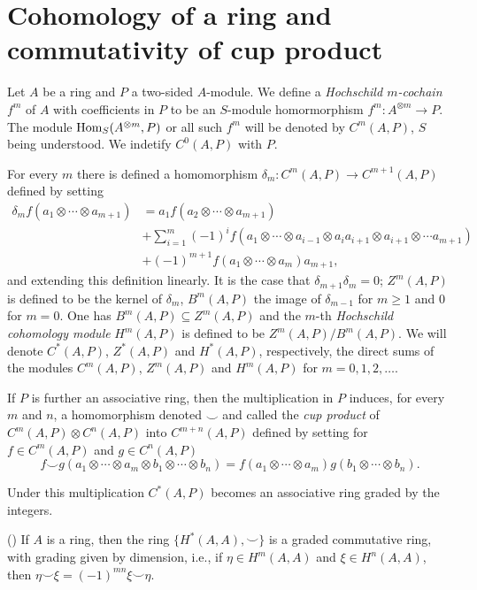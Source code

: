 \documentclass[TFM.tex]{subfiles}
\begin{document}
\section{Cohomology of a ring and commutativity of cup product}

\begin{defi}Let $A$ be a ring and $P$ a two-sided $A$-module. We define a \emph{Hochschild $m$-cochain} $f^m$ of $A$ with coefficients in $P$ to be an $S$-module homormorphism $f^m: A^{\otimes m}\to P$. The module $\operatorname{Hom}_S(A^{\otimes m}, P)$ or all such $f^m$ will be denoted by $C^m(A,P)$, $S$ being understood. We indetify $C^0(A,P)$ with $P$.
\end{defi}

For every $m$ there is defined a homomorphism $\delta_m: C^m(A,P)\to C^{m+1}(A,P)$ defined by setting
\begin{align*}
\delta_m f(a_1\otimes\cdots\otimes a_{m+1})&=a_1f(a_2\otimes\cdots\otimes a_{m+1})\\
& +\sum_{i=1}^m(-1)^if(a_1\otimes\cdots\otimes a_{i-1}\otimes a_ia_{i+1}\otimes a_{i+1}\otimes\cdots a_{m+1})\\
& +(-1)^{m+1}f(a_1\otimes\cdots\otimes a_m)a_{m+1},
\end{align*}
and extending this definition linearly. It is the case that $\delta_{m+1}\delta_m=0$; $Z^m(A,P)$ is defined to be the kernel of $\delta_m$, $B^m(A,P)$ the image of $\delta_{m-1}$ for $m\geq 1$ and 0 for $m=0$. One has $B^m(A,P)\subseteq Z^m(A,P)$ and the $m$-th \emph{Hochschild cohomology module} $H^m(A,P)$ is defined to be $Z^m(A,P)/B^m(A,P)$. We will denote $C^*(A,P)$, $Z^*(A,P)$ and $H^*(A,P)$, respectively, the direct sums of the modules $C^m(A,P)$, $Z^m(A,P)$ and $H^m(A,P)$ for $m=0,1,2,\dots$. 

If $P$ is further an associative ring, then the multiplication in $P$ induces, for every $m$ and $n$, a homomorphism denoted $\smile$ and called the \emph{cup product} of $C^m(A,P)\otimes C^n(A,P)$ into $C^{m+n}(A,P)$ defined by setting for $f\in C^m(A,P)$ and $g\in C^n(A,P)$
\[
f\smile g(a_1\otimes\cdots\otimes a_m\otimes b_1\otimes\cdots\otimes b_n)=f(a_1\otimes\cdots\otimes a_m)g(b_1\otimes\cdots\otimes b_n).
\]

Under this multiplication $C^*(A,P)$ becomes an associative ring graded by the integers.

\begin{thm}(\cite[Corollary 1 of ]{Gerstenhaber})
If $A$ is a ring, then the ring $\{H^*(A,A),\smile\}$ is a graded commutative ring, with grading given by dimension, i.e., if $\eta\in H^m(A,A)$ and $\xi\in H^n(A,A)$, then $\eta\smile \xi =(-1)^{mn}\xi\smile \eta$.
\end{thm} 
\end{document}
